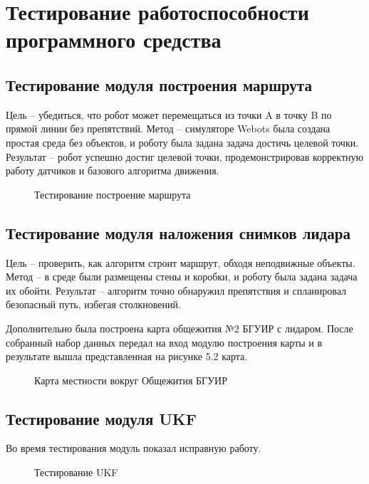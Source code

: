 \section{Тестирование работоспособности программного средства}

\subsection{Тестирование модуля построения маршрута}

Цель -- убедиться, что робот может перемещаться из точки A в точку B по прямой
линии без препятствий.
Метод -- симуляторе Webots была создана простая среда без
объектов, и роботу была задана задача достичь целевой точки.
Результат -- робот успешно достиг целевой точки, продемонстрировав корректную
работу датчиков и базового алгоритма движения.

\FloatBarrier
\begin{figure}[h]
\centering
\caption{Тестирование построение маршрута}
\end{figure}
\FloatBarrier

\subsection{Тестирование модуля наложения снимков лидара}

Цель -- проверить, как алгоритм строит маршрут, обходя неподвижные объекты.
Метод -- в среде были размещены стены и коробки, и роботу была задана задача их
обойти. Результат -- алгоритм точно обнаружил препятствия и спланировал
безопасный путь, избегая столкновений.

Дополнительно была построена карта общежития №2 БГУИР с лидаром. После собранный
набор данных передал на вход модулю построения карты и в результате вышла
представленная на рисунке 5.2 карта.
\FloatBarrier
\begin{figure}[h]
\centering
\caption{Карта местности вокруг Общежития  БГУИР}
\end{figure}
\FloatBarrier


\subsection{Тестирование модуля UKF}

Во время тестирования модуль показал исправную работу.

\FloatBarrier
\begin{figure}[h]
\centering
\caption{Тестирование UKF}
\end{figure}
\FloatBarrier

